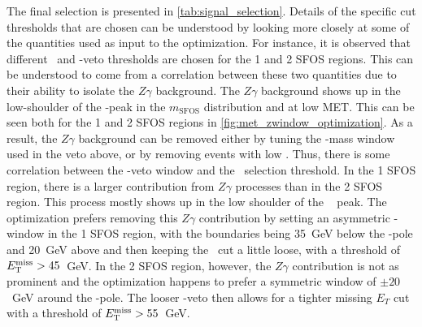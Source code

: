 The final selection is presented in \tab\ref{tab:signal_selection}.
Details of the specific cut thresholds that are chosen can be understood
by looking more closely at some of the quantities used as input to 
the optimization. For instance, it is observed that
different \MET~and \z-veto thresholds are chosen for the 1 and 2 SFOS
regions. This can be understood to come from a correlation between
these two quantities due to their ability to isolate the $Z\gamma$
background.
The $Z\gamma$ background shows up in the low-shoulder of the \z-peak
in the $m_{\textrm{SFOS}}$ distribution and at low MET. This can be
seen both for the 1 and 2 SFOS regions in \fig\ref{fig:met_zwindow_optimization}.
As a result, the $Z\gamma$ background can be removed either by tuning 
the \z-mass window used in the veto above, or by removing events with low \met.
Thus, there is some correlation 
between the \z-veto window and the \met~selection threshold. 
In the 1 SFOS region, there is a larger 
contribution from $Z\gamma$ processes than in the 2 SFOS
region.  This process mostly shows up in the low shoulder 
of the \z~ peak. The optimization
prefers removing this $Z\gamma$ contribution by setting an 
asymmetric \z-window in the 1 SFOS
region, with the boundaries being 35~GeV below the \z-pole 
and 20~GeV above and then keeping the \MET~cut a little loose, with a 
threshold of $E_{\mathrm{T}}^{\mathrm{miss}} > 45$~GeV.  In the 2 SFOS region, however,
the $Z\gamma$ contribution is not as prominent and the 
optimization happens to prefer a symmetric
window of $\pm20$~GeV around the \z-pole.  
The looser \z-veto then allows for a tighter
missing $E_{T}$ cut with a threshold of $E_{\mathrm{T}}^{\mathrm{miss}} > 55$~GeV. 

